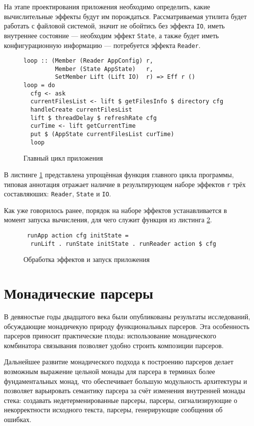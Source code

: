 На этапе проектирования приложения необходимо определить, какие вычислительные эффекты будут им порождаться. Рассматриваемая утилита будет работать с файловой системой, значит не обойтись без эффекта \lstinline{IO}, иметь внутреннее состояние --- необходим эффект \lstinline{State}, а также будет иметь конфигурационную информацию --- потребуется эффекта \lstinline{Reader}.

\begin{figure}[t]
\begin{lstlisting}
loop :: (Member (Reader AppConfig) r, 
         Member (State AppState)   r, 
         SetMember Lift (Lift IO)  r) => Eff r ()
loop = do
  cfg <- ask 
  currentFilesList <- lift $ getFilesInfo $ directory cfg
  handleCreate currentFilesList
  lift $ threadDelay $ refreshRate cfg
  curTime <- lift getCurrentTime
  put $ (AppState currentFilesList curTime)
  loop
\end{lstlisting}
\caption{Главный цикл приложения}
\label{listing:ftMainLoop}
\end{figure}

В листинге \ref{listing:ftMainLoop} представлена упрощённая функция главного цикла программы, типовая аннотация отражает наличие в результирующем наборе эффектов \lstinline{r} трёх составляюших: \lstinline{Reader}, \lstinline{State} и \lstinline{IO}.

Как уже говорилось ранее, порядок на наборе эффектов устанавливается в момент запуска вычисления, для чего служит функция из листинга \ref{listing:ftRun}.

\begin{figure}[t]
\begin{lstlisting}
 runApp action cfg initState = 
  runLift . runState initState . runReader action $ cfg
\end{lstlisting}
\caption{Обработка эффектов и запуск приложения}
\label{listing:ftRun}
\end{figure}

\section{Монадические парсеры}

В девяностые годы двадцатого века были опубликованы результаты исследований, обсуждающие монадичекую природу функциональных парсеров. Эта особенность парсеров приносит практические плоды: использование монадического комбинатора связывания позволяет удобно строить композиции парсеров. 

Дальнейшее развитие монадического подхода к построению парсеров делает возможным выражение цельной монады для парсера в терминах более фундаментальных монад, что обеспечивает большую модульность архитектуры и позволяет варьировать семантику парсера за счёт изменения внутренней монады стека: создавать недетерменированные парсеры, парсеры, сигнализирующие о некорректности исходного текста, парсеры, генерирующие сообщения об ошибках.

